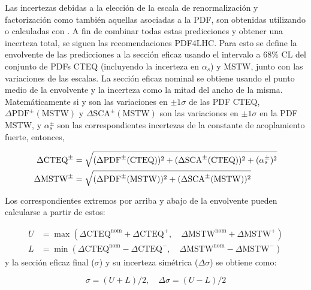 \newcommand{\pdfmstwpm}{\ensuremath{\Delta\mathrm{PDF}^{\pm}(\mathrm{MSTW})}}
\newcommand{\scamstwpm}{\ensuremath{\Delta\mathrm{SCA}^{\pm}(\mathrm{MSTW})}}

\newcommand{\alphap}{\ensuremath{\alpha_s_+}}
\newcommand{\alpham}{\ensuremath{\alpha_s^-}}
\newcommand{\alphapm}{\ensuremath{\alpha_s^{\pm}}}

Las incertezas debidas a la elección de la escala de renormalización y
factorización como también aquellas asociadas a la PDF, son obtenidas utilizando {\nllfast} o
calculadas con {\prospino}. A fin de combinar todas estas predicciones y obtener
una incerteza total, se siguen las recomendaciones PDF4LHC\cite{Botje:2011sn}.
Para esto se define la envolvente de las predicciones a la sección eficaz usando
el intervalo a 68\% CL del conjunto de PDFs CTEQ (incluyendo la incerteza en
$\alpha_s$) y MSTW, junto con las variaciones de las escalas. La sección eficaz
nominal se obtiene usando el punto medio de la envolvente y la incerteza como la
mitad del ancho de la misma. Matemáticamente si {\pdfcteqpm} y {\scacteqpm} son
las variaciones en $\pm 1\sigma$ de las PDF CTEQ,  {\pdfmstwpm} y {\scamstwpm}
son las variaciones en $\pm 1\sigma$ en la PDF MSTW, y {\alphapm} son las
correspondientes incertezas de la constante de acoplamiento fuerte, entonces,

\begin{align}
  \Delta\mathrm{CTEQ}^{\pm} &= \sqrt{(\pdfcteqpm)^2 + (\scacteqpm)^2 + (\alphapm)^2} \\
  \Delta\mathrm{MSTW}^{\pm} &= \sqrt{(\pdfmstwpm)^2 + (\scamstwpm)^2}
\end{align}

Los correspondientes extremos por arriba y abajo de la envolvente pueden calcularse a partir de estos:

\begin{align}
  U &= \max(\Delta\mathrm{CTEQ}^\mathrm{nom} + \Delta\mathrm{CTEQ}^{+},\quad \Delta\mathrm{MSTW}^\mathrm{nom} + \Delta\mathrm{MSTW}^{+}) \\
  L &= \min(\Delta\mathrm{CTEQ}^\mathrm{nom} - \Delta\mathrm{CTEQ}^{-},\quad \Delta\mathrm{MSTW}^\mathrm{nom} - \Delta\mathrm{MSTW}^{-})
\end{align}
%
y la sección eficaz final ($\sigma$) y su incerteza simétrica ($\Delta\sigma$) se obtiene como:

\begin{equation}
  \sigma = (U+L)/2,\quad \Delta\sigma = (U-L)/2
\end{equation}


